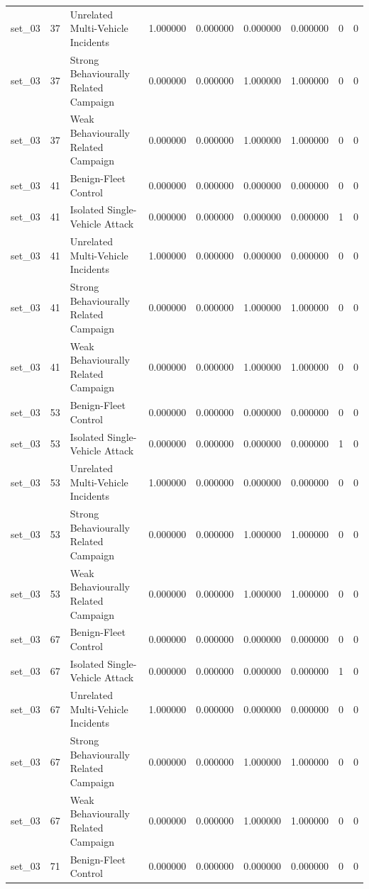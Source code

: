 \begin{tabular}{lrlrrrrrr}
set_03 & 37 & Unrelated Multi-Vehicle Incidents & 1.000000 & 0.000000 & 0.000000 & 0.000000 & 0 & 0 \\
set_03 & 37 & Strong Behaviourally Related Campaign & 0.000000 & 0.000000 & 1.000000 & 1.000000 & 0 & 0 \\
set_03 & 37 & Weak Behaviourally Related Campaign & 0.000000 & 0.000000 & 1.000000 & 1.000000 & 0 & 0 \\
set_03 & 41 & Benign-Fleet Control & 0.000000 & 0.000000 & 0.000000 & 0.000000 & 0 & 0 \\
set_03 & 41 & Isolated Single-Vehicle Attack & 0.000000 & 0.000000 & 0.000000 & 0.000000 & 1 & 0 \\
set_03 & 41 & Unrelated Multi-Vehicle Incidents & 1.000000 & 0.000000 & 0.000000 & 0.000000 & 0 & 0 \\
set_03 & 41 & Strong Behaviourally Related Campaign & 0.000000 & 0.000000 & 1.000000 & 1.000000 & 0 & 0 \\
set_03 & 41 & Weak Behaviourally Related Campaign & 0.000000 & 0.000000 & 1.000000 & 1.000000 & 0 & 0 \\
set_03 & 53 & Benign-Fleet Control & 0.000000 & 0.000000 & 0.000000 & 0.000000 & 0 & 0 \\
set_03 & 53 & Isolated Single-Vehicle Attack & 0.000000 & 0.000000 & 0.000000 & 0.000000 & 1 & 0 \\
set_03 & 53 & Unrelated Multi-Vehicle Incidents & 1.000000 & 0.000000 & 0.000000 & 0.000000 & 0 & 0 \\
set_03 & 53 & Strong Behaviourally Related Campaign & 0.000000 & 0.000000 & 1.000000 & 1.000000 & 0 & 0 \\
set_03 & 53 & Weak Behaviourally Related Campaign & 0.000000 & 0.000000 & 1.000000 & 1.000000 & 0 & 0 \\
set_03 & 67 & Benign-Fleet Control & 0.000000 & 0.000000 & 0.000000 & 0.000000 & 0 & 0 \\
set_03 & 67 & Isolated Single-Vehicle Attack & 0.000000 & 0.000000 & 0.000000 & 0.000000 & 1 & 0 \\
set_03 & 67 & Unrelated Multi-Vehicle Incidents & 1.000000 & 0.000000 & 0.000000 & 0.000000 & 0 & 0 \\
set_03 & 67 & Strong Behaviourally Related Campaign & 0.000000 & 0.000000 & 1.000000 & 1.000000 & 0 & 0 \\
set_03 & 67 & Weak Behaviourally Related Campaign & 0.000000 & 0.000000 & 1.000000 & 1.000000 & 0 & 0 \\
set_03 & 71 & Benign-Fleet Control & 0.000000 & 0.000000 & 0.000000 & 0.000000 & 0 & 0 \\

\end{tabular}
